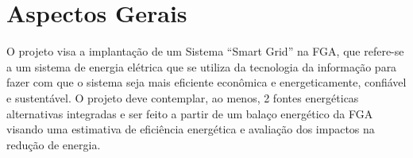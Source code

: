 \chapter[Aspectos Gerais]{Aspectos Gerais}

O projeto visa a implantação de um Sistema “Smart Grid” na FGA, que refere-se a um sistema de energia elétrica que se utiliza da tecnologia da informação para fazer com que o sistema seja mais eficiente econômica e energeticamente, confiável e sustentável. O projeto deve contemplar, ao menos, 2 fontes energéticas alternativas integradas e ser feito a partir de um balaço energético da FGA visando uma estimativa de eficiência energética e avaliação dos impactos na redução de energia.